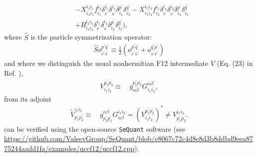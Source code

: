 \documentclass[aip,onecolumn,preprint]{revtex4-1}
\begin{document}
\begin{align}
  & - {{X^{{i_3}{i_1}}_{{i_4}{i_5}}}{f^{{i_2}}_{{i_1}}}{\delta^{{i_5}}_{r^\prime}}{\delta^{{i_4}}_{s^\prime}}{\delta^{p^\prime}_{{i_2}}}{\delta^{q^\prime}_{{i_3}}}} - {{X^{{i_5}{i_3}}_{{i_1}{i_4}}}{f^{{i_1}}_{{i_2}}}{\delta^{{i_4}}_{r^\prime}}{\delta^{{i_2}}_{s^\prime}}{\delta^{p^\prime}_{{i_3}}}{\delta^{q^\prime}_{{i_5}}}} \nonumber \\
  & + {{B^{{i_2}{i_3}}_{{i_1}{i_4}}}{\delta^{{i_1}}_{r^\prime}}{\delta^{{i_4}}_{s^\prime}}{\delta^{p^\prime}_{{i_2}}}{\delta^{q^\prime}_{{i_3}}}}),
  \end{align}
where $\hat{S}$ is the particle symmetrization operator:
\begin{align}
\hat{S}o^{p^\prime q^\prime}_{r^\prime s^\prime} \equiv \frac{1}{2}(o^{p^\prime q^\prime}_{r^\prime s^\prime} + o^{q^\prime p^\prime}_{s^\prime r^\prime})
\end{align}
and where we distinguish the usual nonhermitian F12 intermediate $V$ (Eq. (23) in Ref. ),
\begin{align}
{V_{{i_1}{i_2}}^{{p^{\prime}_1}{p^{\prime}_2}}} \equiv \, & g_{\alpha \beta}^{p^{\prime}_1 p^{\prime}_2} G_{i_1 i_2}^{\alpha \beta} ,
\end{align}
from its adjoint
\begin{align}
{\tilde{V}^{{i_1}{i_2}}_{{p^{\prime}_1}{p^{\prime}_2}}} \equiv \, & g^{\alpha \beta}_{p^{\prime}_1 p^{\prime}_2} G^{i_1 i_2}_{\alpha \beta} = \left( {V_{{i_1}{i_2}}^{{p^{\prime}_1}{p^{\prime}_2}}} \right)^* \neq {V^{{i_1}{i_2}}_{{p^{\prime}_1}{p^{\prime}_2}}}.
\end{align}
 can be verified using the open-source {\tt SeQuant} software (see \url{https://github.com/ValeevGroup/SeQuant/blob/e8067c72c4d8e8d3b8ddbd9eea8775244aadd1fa/examples/uccf12/uccf12.cpp}).
\end{document}
